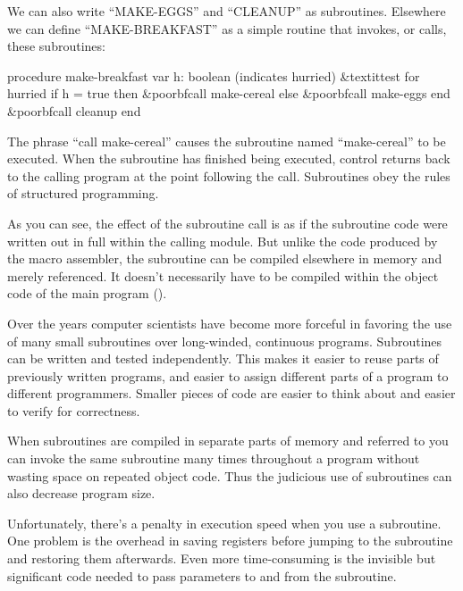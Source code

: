 
We can also write {}``MAKE-EGGS'' and {}``CLEANUP'' as subroutines.
Elsewhere we can define {}``MAKE-BREAKFAST'' as a simple routine
that invokes, or calls, these subroutines:

\begin{Code}[commandchars=\&\{\}]
procedure make-breakfast
   var h: boolean (indicates hurried)
   &textit{test for hurried}
   if h = true then
      &poorbf{call make-cereal}
   else
      &poorbf{call make-eggs}
   end
   &poorbf{call cleanup}
end
\end{Code}


\medskip

The phrase {}``call make-cereal'' causes the subroutine named {}``make-cereal''
to be executed. When the subroutine has finished being executed, control
returns back to the calling program at the point following the call.
Subroutines obey the rules of structured programming.

As you can see, the effect of the subroutine call is as if the subroutine
code were written out in full within the calling module. But unlike
the code produced by the macro assembler, the subroutine can be compiled
elsewhere in memory and merely referenced. It doesn't necessarily
have to be compiled within the object code of the main program ().


Over the years computer scientists have become more forceful in favoring
the use of many small subroutines over long-winded, continuous programs.
Subroutines can be written and tested independently. This makes it
easier to reuse parts of previously written programs, and easier to
assign different parts of a program to different programmers. Smaller
pieces of code are easier to think about and easier to verify for
correctness.

When subroutines are compiled in separate parts of memory and referred
to you can invoke the same subroutine many times throughout a program
without wasting space on repeated object code. Thus the judicious
use of subroutines can also decrease program size. 

Unfortunately, there's a penalty in execution speed when you use a
subroutine. One problem is the overhead in saving registers before
jumping to the subroutine and restoring them afterwards. Even more
time-consuming is the invisible but significant code needed to pass
parameters to and from the subroutine.

